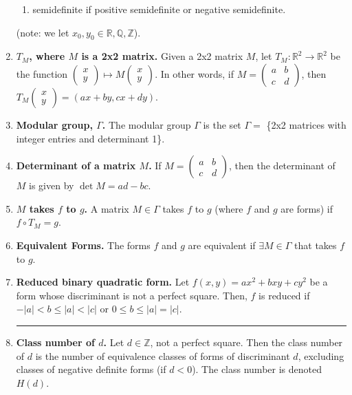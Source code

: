 \documentclass[12pt]{article}
\theoremstyle{definition}
\theoremstyle{named}
\begin{document}
\begin{enumerate}
\begin{enumerate}
        \item semidefinite if positive semidefinite or negative semidefinite. 
    \end{enumerate}
    (note: we let $x_0,y_0 \in \mathbb{R},\mathbb{Q}, \mathbb{Z}$). 
    \item \textbf{$T_M$, where $M$ is a 2x2 matrix. } Given a 2x2 matrix $M$, let $T_M: \mathbb{R}^2 \to \mathbb{R}^2$ be the function $\begin{pmatrix}
        x \\
        y
    \end{pmatrix} \mapsto M\begin{pmatrix}
    x \\
    y
    \end{pmatrix}$. In other words, if $M = \begin{pmatrix}
        a & b \\
        c & d
    \end{pmatrix}$, then $T_M \begin{pmatrix}
        x \\
        y
    \end{pmatrix} = (ax+by, cx+dy)$. 
    \item \textbf{Modular group, $\Gamma$. } The modular group $\Gamma$ is the set $\Gamma = $ \{2x2 matrices with integer entries and determinant 1\}. 
    \item \textbf{Determinant of a matrix $M$. } If $M = \begin{pmatrix}
        a & b \\
        c & d
    \end{pmatrix}$, then the determinant of $M$ is given by $\det M = ad - bc$. 
    \item \textbf{$M$ takes $f$ to $g$. } A matrix $M \in \Gamma$ takes $f$ to $g$ (where $f$ and $g$ are forms) if $f \circ T_M = g$. 
    \item \textbf{Equivalent Forms. } The forms $f$ and $g$ are equivalent if $\exists M \in \Gamma$ that takes $f$ to $g$. 
    \item \textbf{Reduced binary quadratic form. } Let $f(x,y) = ax^2 + bxy + cy^2$ be a form whose discriminant is not a perfect square. Then, $f$ is reduced if $-|a| < b \leq |a| < |c|$ or $0 \leq b \leq |a| = |c|$. 
    \begin{center}
        \hrule
    \end{center}
    \item \textbf{Class number of $d$. } Let $d \in \mathbb{Z}$, not a perfect square. Then the class number of $d$ is the number of equivalence classes of forms of discriminant $d$, excluding classes of negative definite forms (if $d<0$). The class number is denoted $H(d)$. 

\end{enumerate}
\end{document}
